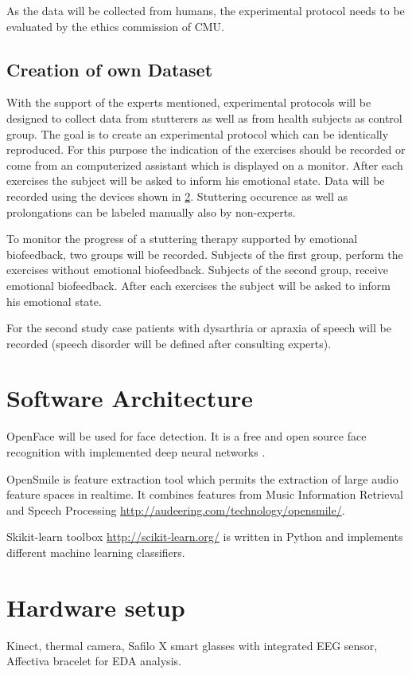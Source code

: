 As the data will be collected from humans, the experimental protocol needs to be evaluated by the ethics commission of CMU.

\subsection{Creation of own Dataset}

With the support of the experts mentioned, experimental protocols will be designed to collect data from stutterers as well as from health subjects as control group. The goal is to create an experimental protocol which can be identically reproduced. For this purpose the indication of the exercises should be recorded or come from an computerized assistant which is displayed on a monitor. After each exercises the subject will be asked to inform his emotional state. Data will 
be recorded using the devices shown in \ref{sec:hardware}. Stuttering occurence as well as prolongations can be labeled manually also by non-experts.

To monitor the progress of a stuttering therapy supported by emotional biofeedback, two groups will be recorded. Subjects of the first group, perform the exercises without emotional biofeedback. Subjects of the second group, receive emotional biofeedback. After each exercises the subject will be asked to inform his emotional state. 


For the second study case patients with dysarthria or apraxia of speech will be recorded (speech disorder will be defined after consulting experts).


\section{Software Architecture}
\label{sec:toolbox}

OpenFace will be used for face detection. It is a free and open source face recognition with implemented deep neural networks \cite{Amos2016openface}.

OpenSmile is feature extraction tool which permits the extraction of large audio feature spaces in realtime. It combines features from Music Information Retrieval and Speech Processing \url{http://audeering.com/technology/opensmile/}.

Skikit-learn toolbox \url{http://scikit-learn.org/} is written in Python and implements different machine learning classifiers.


\section{Hardware setup}
\label{sec:hardware}
Kinect, thermal camera, Safilo X smart glasses with integrated EEG sensor, Affectiva bracelet for EDA analysis. 

